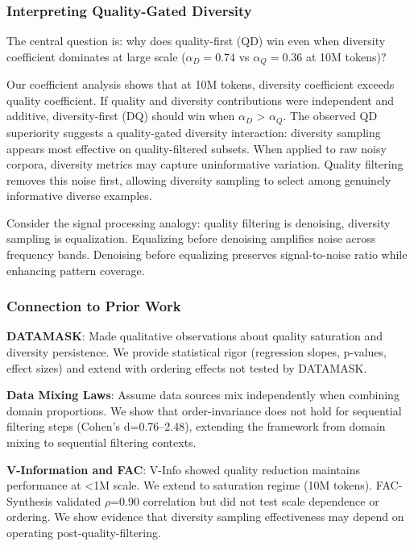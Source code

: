 
\subsubsection{Interpreting Quality-Gated Diversity}

The central question is: why does quality-first (QD) win even when diversity coefficient dominates at large scale ($\alpha _{D}=0.74$ vs $\alpha _{Q}=0.36$ at 10M tokens)?

Our coefficient analysis shows that at 10M tokens, diversity coefficient exceeds quality coefficient. If quality and diversity contributions were independent and additive, diversity-first (DQ) should win when $\alpha _D$ > $\alpha _Q$. The observed QD superiority suggests a quality-gated diversity interaction: diversity sampling appears most effective on quality-filtered subsets. When applied to raw noisy corpora, diversity metrics may capture uninformative variation. Quality filtering removes this noise first, allowing diversity sampling to select among genuinely informative diverse examples.

Consider the signal processing analogy: quality filtering is denoising, diversity sampling is equalization. Equalizing before denoising amplifies noise across frequency bands. Denoising before equalizing preserves signal-to-noise ratio while enhancing pattern coverage.

\subsubsection{Connection to Prior Work}

\textbf{DATAMASK}: Made qualitative observations about quality saturation and diversity persistence. We provide statistical rigor (regression slopes, p-values, effect sizes) and extend with ordering effects not tested by DATAMASK.

\textbf{Data Mixing Laws}: Assume data sources mix independently when combining domain proportions. We show that order-invariance does not hold for sequential filtering steps (Cohen's d=0.76--2.48), extending the framework from domain mixing to sequential filtering contexts.

\textbf{V-Information and FAC}: V-Info showed quality reduction maintains performance at <1M scale. We extend to saturation regime (10M tokens). FAC-Synthesis validated $\rho$=0.90 correlation but did not test scale dependence or ordering. We show evidence that diversity sampling effectiveness may depend on operating post-quality-filtering.

